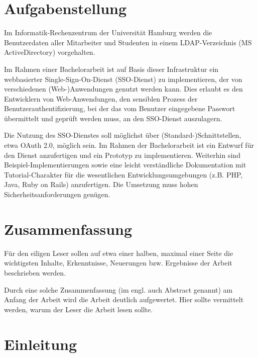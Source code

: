\documentclass[12pt,a4paper,pointednumbers,abstracton]{scrartcl}
\newcommand{\changefont}[3]{
\fontfamily{#1} \fontseries{#2} \fontshape{#3} \selectfont}
\newcommand{\blankpage}{
\newpage
\thispagestyle{empty}
\null
\vfill
\begin{center}
	This page is intentionally left blank.
\end{center}
\newpage
}
\begin{document}
\normalsize
\changefont{ppl}{m}{n}
\newpage
\setcounter{page}{1}
\section*{Aufgabenstellung}

Im Informatik-Rechenzentrum der Universität Hamburg werden die Benutzerdaten aller Mitarbeiter und Studenten in einem LDAP-Verzeichnis (MS ActiveDirectory) vorgehalten.

Im Rahmen einer Bachelorarbeit ist auf Basis dieser Infrastruktur ein webbasierter Single-Sign-On-Dienst (SSO-Dienst) zu implementieren, der von verschiedenen \mbox{(Web-)Anwendungen} genutzt werden kann. Dies erlaubt es den Entwicklern von Web-Anwendungen, den sensiblen Prozess der Benutzerauthentifizierung, bei der das vom Benutzer eingegebene Passwort übermittelt und geprüft werden muss, an den SSO-Dienst auszulagern.

Die Nutzung des SSO-Dienstes soll möglichst über (Standard-)Schnittstellen, etwa OAuth 2.0, möglich sein. Im Rahmen der Bachelorarbeit ist ein Entwurf für den Dienst anzufertigen und ein Prototyp zu implementieren. Weiterhin sind Beispiel-Implementierungen sowie eine leicht verständliche Dokumentation mit Tutorial-Charakter für die wesentlichen Entwicklungsumgebungen (z.B. PHP, Java, Ruby on Rails) anzufertigen. Die Umsetzung muss hohen Sicherheitsanforderungen genügen.

\newpage
\section*{Zusammenfassung}



Für den eiligen Leser sollen auf etwa einer halben, maximal einer Seite die wichtigsten Inhalte, Erkenntnisse, Neuerungen bzw. Ergebnisse der Arbeit beschrieben werden. 

Durch eine solche Zusammenfassung (im engl. auch Abstract genannt) am Anfang der Arbeit wird die Arbeit deutlich aufgewertet. Hier sollte vermittelt werden, warum der Leser die Arbeit lesen sollte.

\newpage
\tableofcontents

\newpage
{}
\setcounter{page}{1}
\section{Einleitung}
\label{sec:einleitung}
\end{document}
